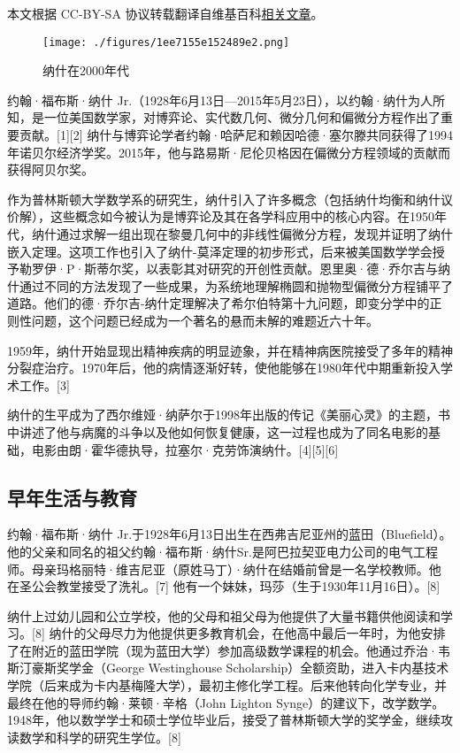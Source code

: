 
本文根据 CC-BY-SA 协议转载翻译自维基百科\href{https://en.wikipedia.org/wiki/John_Forbes_Nash_Jr.}{相关文章}。

\begin{figure}[ht]
\centering
\texttt{[image: ./figures/1ee7155e152489e2.png]}
\caption{纳什在2000年代} \label{fig_JFNJY_1}
\end{figure}
约翰·福布斯·纳什 Jr.（1928年6月13日—2015年5月23日），以约翰·纳什为人所知，是一位美国数学家，对博弈论、实代数几何、微分几何和偏微分方程作出了重要贡献。[1][2] 纳什与博弈论学者约翰·哈萨尼和赖因哈德·塞尔滕共同获得了1994年诺贝尔经济学奖。2015年，他与路易斯·尼伦贝格因在偏微分方程领域的贡献而获得阿贝尔奖。

作为普林斯顿大学数学系的研究生，纳什引入了许多概念（包括纳什均衡和纳什议价解），这些概念如今被认为是博弈论及其在各学科应用中的核心内容。在1950年代，纳什通过求解一组出现在黎曼几何中的非线性偏微分方程，发现并证明了纳什嵌入定理。这项工作也引入了纳什-莫泽定理的初步形式，后来被美国数学学会授予勒罗伊·P·斯蒂尔奖，以表彰其对研究的开创性贡献。恩里奥·德·乔尔吉与纳什通过不同的方法发现了一些成果，为系统地理解椭圆和抛物型偏微分方程铺平了道路。他们的德·乔尔吉-纳什定理解决了希尔伯特第十九问题，即变分学中的正则性问题，这个问题已经成为一个著名的悬而未解的难题近六十年。

1959年，纳什开始显现出精神疾病的明显迹象，并在精神病医院接受了多年的精神分裂症治疗。1970年后，他的病情逐渐好转，使他能够在1980年代中期重新投入学术工作。[3]

纳什的生平成为了西尔维娅·纳萨尔于1998年出版的传记《美丽心灵》的主题，书中讲述了他与病魔的斗争以及他如何恢复健康，这一过程也成为了同名电影的基础，电影由朗·霍华德执导，拉塞尔·克劳饰演纳什。[4][5][6]
\subsection{早年生活与教育}
约翰·福布斯·纳什 Jr.于1928年6月13日出生在西弗吉尼亚州的蓝田（Bluefield）。他的父亲和同名的祖父约翰·福布斯·纳什Sr.是阿巴拉契亚电力公司的电气工程师。母亲玛格丽特·维吉尼亚（原姓马丁）·纳什在结婚前曾是一名学校教师。他在圣公会教堂接受了洗礼。[7] 他有一个妹妹，玛莎（生于1930年11月16日）。[8]

纳什上过幼儿园和公立学校，他的父母和祖父母为他提供了大量书籍供他阅读和学习。[8] 纳什的父母尽力为他提供更多教育机会，在他高中最后一年时，为他安排了在附近的蓝田学院（现为蓝田大学）参加高级数学课程的机会。他通过乔治·韦斯汀豪斯奖学金（George Westinghouse Scholarship）全额资助，进入卡内基技术学院（后来成为卡内基梅隆大学），最初主修化学工程。后来他转向化学专业，并最终在他的导师约翰·莱顿·辛格（John Lighton Synge）的建议下，改学数学。1948年，他以数学学士和硕士学位毕业后，接受了普林斯顿大学的奖学金，继续攻读数学和科学的研究生学位。[8]

